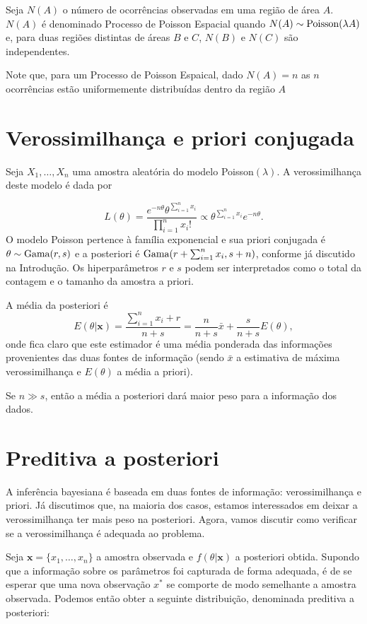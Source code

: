 \documentclass[
  letterpaper,
  DIV=11,
  numbers=noendperiod]{scrreprt}
\theoremstyle{definition}
\theoremstyle{plain}
\theoremstyle{definition}
\theoremstyle{remark}
\begin{document}
Seja \(N(A)\) o número de ocorrências observadas em uma região de área
\(A\). \(N(A)\) é denominado Processo de Poisson Espacial quando
\(N(A)\sim\hbox{Poisson}(\lambda A)\) e, para duas regiões distintas de
áreas \(B\) e \(C\), \(N(B)\) e \(N(C)\) são independentes.

Note que, para um Processo de Poisson Espaical, dado \(N(A)=n\) as \(n\)
ocorrências estão uniformemente distribuídas dentro da região \(A\)

\section{Verossimilhança e priori
conjugada}\label{verossimilhanuxe7a-e-priori-conjugada-1}

Seja \(X_1,\ldots,X_n\) uma amostra aleatória do modelo
Poisson\((\lambda)\). A verossimilhança deste modelo é dada por

\[L(\theta)=\frac{e^{-n\theta}\theta^{\sum_{i=1}^{n}x_i}}{\prod_{i=1}^{n}x_i!}\propto \theta^{\sum_{i=1}^n x_i}e^{-n\theta}.\]
O modelo Poisson pertence à família exponencial e sua priori conjugada é
\(\theta\sim\hbox{Gama}(r,s)\) e a posteriori é
\(\hbox{Gama}(r+\sum_{i=1}^n x_i, s+n)\), conforme já discutido na
Introdução. Os hiperparâmetros \(r\) e \(s\) podem ser interpretados
como o total da contagem e o tamanho da amostra a priori.

A média da posteriori é
\[E(\theta|\mathbf{x})=\frac{\sum_{i=1}^{n}x_i+r}{n+s}=\frac{n}{n+s}\bar{x}+\frac{s}{n+s}E(\theta),\]
onde fica claro que este estimador é uma média ponderada das informações
provenientes das duas fontes de informação (sendo \(\bar{x}\) a
estimativa de máxima verossimilhança e \(E(\theta)\) a média a priori).

Se \(n\gg s\), então a média a posteriori dará maior peso para a
informação dos dados.

\section{Preditiva a posteriori}\label{preditiva-a-posteriori-1}

A inferência bayesiana é baseada em duas fontes de informação:
verossimilhança e priori. Já discutimos que, na maioria dos casos,
estamos interessados em deixar a verossimilhança ter mais peso na
posteriori. Agora, vamos discutir como verificar se a verossimilhança é
adequada ao problema.

Seja \(\boldsymbol{x}=\{x_1,\ldots,x_n\}\) a amostra observada e
\(f(\theta|\boldsymbol{x})\) a posteriori obtida. Supondo que a
informação sobre os parâmetros foi capturada de forma adequada, é de se
esperar que uma nova observação \(x^*\) se comporte de modo semelhante a
amostra observada. Podemos então obter a seguinte distribuição,
denominada preditiva a posteriori:
\end{document}
